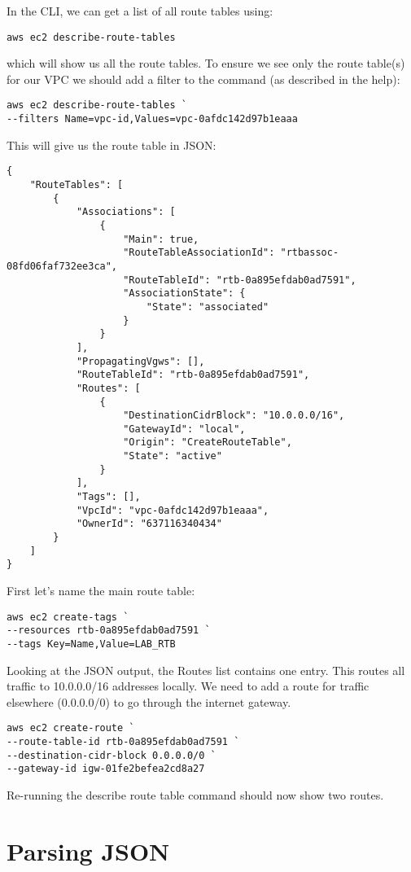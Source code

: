 \documentclass{pgnotes}
\begin{document}
In the CLI, we can get a list of all route tables using:
\begin{verbatim}
aws ec2 describe-route-tables
\end{verbatim}
which will show us all the route tables.
To ensure we see only the route table(s) for our VPC we should add a filter to the command (as described in the help):
\begin{verbatim}
aws ec2 describe-route-tables `
--filters Name=vpc-id,Values=vpc-0afdc142d97b1eaaa
\end{verbatim}
This will give us the route table in JSON:
\begin{verbatim}
{
    "RouteTables": [
        {
            "Associations": [
                {
                    "Main": true,
                    "RouteTableAssociationId": "rtbassoc-08fd06faf732ee3ca",
                    "RouteTableId": "rtb-0a895efdab0ad7591",
                    "AssociationState": {
                        "State": "associated"
                    }
                }
            ],
            "PropagatingVgws": [],
            "RouteTableId": "rtb-0a895efdab0ad7591",
            "Routes": [
                {
                    "DestinationCidrBlock": "10.0.0.0/16",
                    "GatewayId": "local",
                    "Origin": "CreateRouteTable",
                    "State": "active"
                }
            ],
            "Tags": [],
            "VpcId": "vpc-0afdc142d97b1eaaa",
            "OwnerId": "637116340434"
        }
    ]
}
\end{verbatim}
First let's name the main route table:
\begin{verbatim}
aws ec2 create-tags `
--resources rtb-0a895efdab0ad7591 `
--tags Key=Name,Value=LAB_RTB
\end{verbatim}
Looking at the JSON output, the Routes list contains one entry.
This routes all traffic to 10.0.0.0/16 addresses locally.
We need to add a route for traffic elsewhere (0.0.0.0/0) to go through the internet gateway.
\begin{verbatim}
aws ec2 create-route `
--route-table-id rtb-0a895efdab0ad7591 `
--destination-cidr-block 0.0.0.0/0 `
--gateway-id igw-01fe2befea2cd8a27
\end{verbatim}
Re-running the describe route table command should now show two routes.

\section{Parsing JSON}
\end{document}

